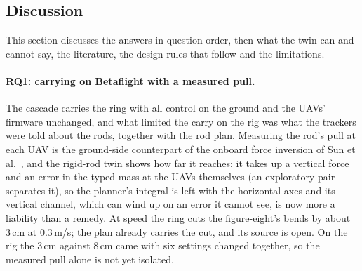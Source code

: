 
\subsection{Discussion}
\label{sec:discussion}

This section discusses the answers in question order, then what the twin can and cannot say, the literature, the
design rules that follow and the limitations.

\paragraph{RQ1: carrying on Betaflight with a measured pull.} The cascade carries the ring with all control on the
ground and the UAVs' firmware unchanged, and what limited the carry on the rig was what
the trackers were told about the rods, together with the rod plan. Measuring the rod's pull at each UAV is the ground-side counterpart of the onboard force
inversion of Sun et al.\ \cite{tudelft}, and the rigid-rod twin shows how far it reaches: it takes up a vertical force
and an error in the typed mass at the UAVs themselves (an exploratory pair separates it), so the planner's integral is
left with the horizontal axes and its vertical channel, which can wind up on an error it cannot see, is now more a
liability than a remedy. At speed the ring cuts the figure-eight's bends by about 3\,cm at 0.3\,m/s; the plan already
carries the cut, and its source is open. On the rig the 3\,cm against 8\,cm came with six settings changed together,
so the measured pull alone is not yet isolated.

